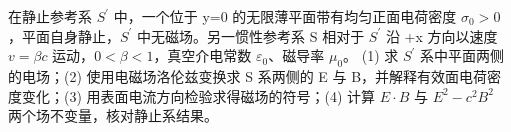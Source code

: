 在静止参考系 \(S^{\prime}\) 中，一个位于 y=0 的无限薄平面带有均匀正面电荷密度 \(\sigma _{0}>0\)，平面自身静止，\(S^{\prime}\) 中无磁场。另一惯性参考系 S 相对于 \(S^{\prime}\) 沿 +x 方向以速度 \(v=\beta c\) 运动，\(0<\beta <1\)，真空介电常数 \(\varepsilon _{0}\)、磁导率 \(\mu _{0}\)。
(1) 求 \(S^{\prime}\) 系中平面两侧的电场；(2) 使用电磁场洛伦兹变换求 S 系两侧的 E 与 B，并解释有效面电荷密度变化；(3) 用表面电流方向检验求得磁场的符号；(4) 计算 \(E\cdot B\) 与 \(E^{2}-c^{2}B^{2}\) 两个场不变量，核对静止系结果。

